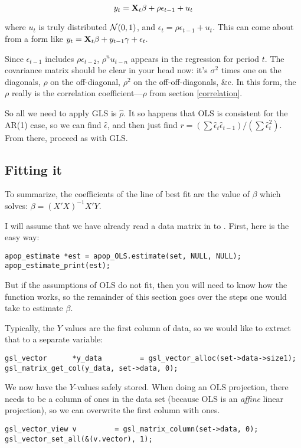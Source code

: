 $$y_t={\bf X}_t\beta + \rho\epsilon_{t-1} + u_t$$

where $u_t$ is truly distributed ${\cal N}(0,1)$, and $\epsilon_t=
\rho\epsilon_{t-1} + u_t$. This can come about from  a form like
$y_t={\bf X}_t\beta + y_{t-1}\gamma + \epsilon_t.$


Since $\epsilon_{t-1}$ includes $\rho\epsilon_{t-2}$, $\rho^n u_{t-n}$
appears in the regression for period $t$. The covariance matrix should
be clear in your head now: it's $\sigma^2$ times one on the diagonals,
$\rho$ on the off-diagonal, $\rho^2$ on the off-off-diagonals, \&c. In
this form, the $\rho$ really is the correlation coefficient---$\rho$
from section \ref{correlation}.

So all we need to apply GLS is $\hat\rho$. It so happens that OLS is
consistent for the AR(1) case, so we can find $\hat\epsilon$, and then
just find $r=(\sum \hat\epsilon_t \hat\epsilon_{t-1})/(\sum
\hat\epsilon_t^2)$. From there, proceed as with GLS.



\subsection{Fitting it} 
To summarize,
the coefficients of  the line of best fit are the value of $\beta$ which solves:
$ \beta = (X'X)^{-1}X'Y$.

I will assume that we have already read a data matrix in to . First, here is the easy way:
\begin{lstlisting}
apop_estimate *est = apop_OLS.estimate(set, NULL, NULL);
apop_estimate_print(est);
\end{lstlisting}
But if the assumptions of OLS do not fit, then you will need to know how
the  function works, so the remainder of this
section goes over the steps one would take to estimate $\beta$.  

 Typically, the $Y$
values are the first column of data, so we would like to extract that to a separate variable:
\begin{lstlisting}
gsl_vector      *y_data         = gsl_vector_alloc(set->data->size1);
gsl_matrix_get_col(y_data, set->data, 0);
\end{lstlisting}

We now have the $Y$-values safely stored.  When doing an OLS projection,
there needs to be a column of ones in the data set (because OLS is an
{\sl affine} linear projection), so we can overwrite the first column
with ones. 
\begin{lstlisting}
gsl_vector_view v         = gsl_matrix_column(set->data, 0);
gsl_vector_set_all(&(v.vector), 1);  
\end{lstlisting}


